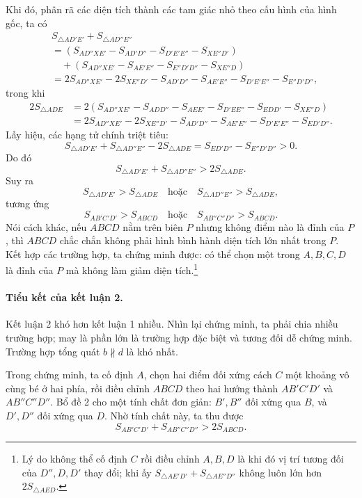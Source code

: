 \documentclass[11pt]{article}
\newcommand{\area}[1]{S_{#1}}
\begin{document}
Khi đó, phân rã các diện tích thành các tam giác nhỏ theo cấu hình của hình
gốc, ta có
\[
\begin{aligned}
&\area{\triangle AD'E'}+\area{\triangle AD''E''}\\
&=(\area{AD''XE'}-\area{AD'D''}-\area{D'E'E''}-\area{XE''D'})\\
&\quad+(\area{AD''XE'}-\area{AE'E''}-\area{E''D'D''}-\area{XE''D})\\
&=2\area{AD''XE'}-2\area{XE''D'}
  -\area{AD'D''}-\area{AE'E''}-\area{D'E'E''}-\area{E''D'D''},
\end{aligned}
\]
trong khi
\[
\begin{aligned}
2\area{\triangle ADE}
&=2(\area{AD''XE'}-\area{ADD''}-\area{AEE'}-\area{D'EE''}
  -\area{EDD'}-\area{XE''D})\\
&=2\area{AD''XE'}-2\area{XE''D'}
  -\area{AD'D''}-\area{AE'E''}-\area{D'E'E''}-\area{ED'D''}.
\end{aligned}
\]
Lấy hiệu, các hạng tử chính triệt tiêu:
\[
  \area{\triangle AD'E'}+\area{\triangle AD''E''}
  -2\area{\triangle ADE}
  =\area{ED'D''}-\area{E''D'D''}>0.
\]
Do đó
\[
  \area{\triangle AD'E'}+\area{\triangle AD''E''}>2\area{\triangle ADE}.
\]
Suy ra
\[
  \area{\triangle AD'E'}>\area{\triangle ADE}
  \quad\text{hoặc}\quad
  \area{\triangle AD''E''}>\area{\triangle ADE},
\]
tương ứng
\[
  \area{AB'C'D'}>\area{ABCD}
  \quad\text{hoặc}\quad
  \area{AB''C''D''}>\area{ABCD}.
\]
Nói cách khác, nếu \(ABCD\) nằm trên biên \(P\) nhưng không điểm nào là đỉnh
của \(P\), thì \(ABCD\) chắc chắn không phải hình bình hành diện tích lớn nhất
trong \(P\). Kết hợp các trường hợp, ta chứng minh được: có thể chọn một trong
\(A,B,C,D\) là đỉnh của \(P\) mà không làm giảm diện tích.\footnote{Lý do
không thể cố định \(C\) rồi điều chỉnh \(A,B,D\) là khi đó vị trí tương đối
của \(D'',D,D'\) thay đổi; khi ấy \(\area{\triangle AE'D'}+
\area{\triangle AE''D''}\) không luôn lớn hơn
\(2\area{\triangle AED}\).}

\paragraph{Tiểu kết của kết luận 2.}
Kết luận 2 khó hơn kết luận 1 nhiều. Nhìn lại chứng minh, ta phải chia nhiều
trường hợp; may là phần lớn là trường hợp đặc biệt và tương đối dễ chứng minh.
Trường hợp tổng quát \(b\not\parallel d\) là khó nhất.

Trong chứng minh, ta cố định \(A\), chọn hai điểm đối xứng cách \(C\) một
khoảng vô cùng bé ở hai phía, rồi điều chỉnh \(ABCD\) theo hai hướng thành
\(AB'C'D'\) và \(AB''C''D''\). Bổ đề 2 cho một tính chất đơn giản: \(B',B''\)
đối xứng qua \(B\), và \(D',D''\) đối xứng qua \(D\). Nhờ tính chất này, ta
thu được
\[
  \area{AB'C'D'}+\area{AB''C''D''}>2\area{ABCD}.
\]
\end{document}
